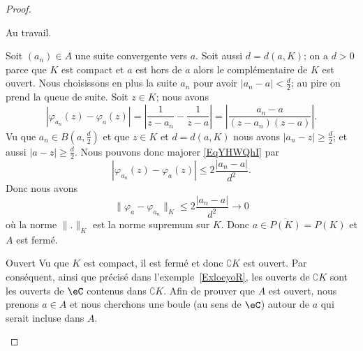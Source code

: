 \begin{proof}
\begin{subproof}
		Au travail.

		Soit \( (a_n)\in A\) une suite convergente vers \( a\). Soit aussi \( d=d(a,K)\); on a \( d>0\) parce que \( K\) est compact et \( a\) est hors de \( a\) alors le complémentaire de \( K\) est ouvert. Nous choisissons en plus la suite \( a_n\) pour avoir \( | a_n-a |<\frac{ d }{2}\); au pire on prend la queue de suite. Soit \( z\in K\); nous avons
		\begin{equation}    \label{EqYHWQhI}
			| \varphi_{a_n}(z)-\varphi_a(z) |=\left| \frac{1}{ z-a_n }-\frac{1}{ z-a } \right| =  \left| \frac{ a_n-a }{ (z-a_n)(z-a) } \right|.
		\end{equation}
		Vu que \( a_n\in B(a,\frac{ d }{2})\) et que \( z\in K\) et \( d=d(a,K)\) nous avons \( | a_n-z |\geq \frac{ d }{2}\); et aussi \( | a-z |\geq \frac{ d }{2}\). Nous pouvons donc majorer \eqref{EqYHWQhI} par
		\begin{equation}
			| \varphi_{a_n}(z)-\varphi_a(z) |\leq 2\frac{ | a_n-a | }{ d^2 }.
		\end{equation}
		Donc nous avons
		\begin{equation}
			\| \varphi_a-\varphi_{a_n} \|_K\leq 2\frac{ | a_n-a | }{ d^2 }\to 0
		\end{equation}
		où la norme \( \| . \|_K\) est la norme supremum sur \( K\). Donc \( a\in \overline{ P(K) }=P(K)\) et \( A\) est fermé.

		\item[Ouvert] Vu que \( K\) est compact, il est fermé et donc \( \complement K\) est ouvert. Par conséquent, ainsi que précisé dans l'exemple~\ref{ExloeyoR}, les ouverts de \( \complement K\) sont les ouverts de \( \eC\) contenus dans \( \complement K\). Afin de prouver que \( A\) est ouvert, nous prenons  \( a\in A\) et nous cherchons une boule (au sens de \( \eC\)) autour de \( a\) qui serait incluse dans \( A\).


\end{subproof}
\end{proof}
